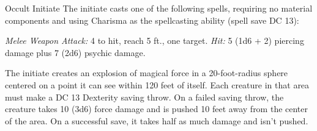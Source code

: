 \documentclass[10pt,a4paper,twoside,bg=print,twocolumn,openany,nodeprecatedcode]{dndbook}
\begin{document}
\begin{DndMonster}[float=t]{Occult Initiate}
\DndMonsterBasics[
armor-class = {12},
hit-points = {\DndDice{12d8 + 12}},
speed = {30 ft.}
]
\DndMonsterAbilityScores[
 str = 10,
 dex = 14,
 con = 12,
 int = 14,
 wis = 10,
 cha = 16
]
\DndMonsterDetails[
skills = {Arcana +6, Deception +5, History +4, Perception +2},
languages = {Common plus one other language},
challenge = 2,
]
The initiate casts one of the following spells, requiring no material components and using Charisma as the spellcasting ability (spell save DC 13):
\begin{DndMonsterSpells}
\end{DndMonsterSpells}
\textsl{Melee Weapon Attack:} 4 to hit, reach 5 ft., one target. \textsl{Hit:} 5 (1d6 + 2) piercing damage plus 7 (2d6) psychic damage.

The initiate creates an explosion of magical force in a 20-foot-radius sphere centered on a point it can see within 120 feet of itself. Each creature in that area must make a DC 13 Dexterity saving throw. On a failed saving throw, the creature takes 10 (3d6) force damage and is pushed 10 feet away from the center of the area. On a successful save, it takes half as much damage and isn't pushed.

\end{DndMonster}
\end{document}
